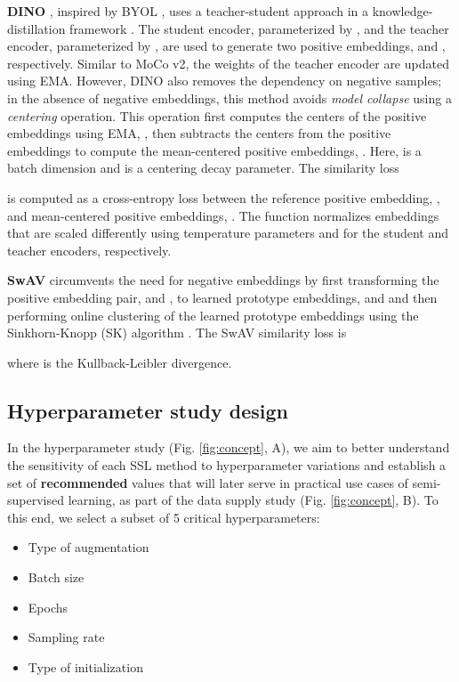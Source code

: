 \documentclass[times,twocolumn,final]{elsarticle}
\begin{document}
\noindent\textbf{DINO} \citep{caron2021emerging}, inspired by BYOL \citep{Byol2020}, uses a teacher-student approach in a knowledge-distillation framework \citep{hinton2015distilling}. The student encoder, parameterized by , and the teacher encoder, parameterized by , are used to generate two positive embeddings,  and , respectively. Similar to MoCo v2, the weights of the teacher encoder are updated using EMA. However, DINO also removes the dependency on negative samples; in the absence of negative embeddings, this method avoids \emph{model collapse} using a \emph{centering} operation. This operation first computes the centers of the positive embeddings using EMA, , then subtracts the centers  from the positive embeddings to compute the mean-centered positive embeddings, . Here,  is a batch dimension and  is a centering decay parameter. The similarity loss 

is computed as a cross-entropy loss between the reference positive embedding, , and mean-centered positive embeddings, . The  function normalizes embeddings that are scaled differently using temperature parameters  and  for the student and teacher encoders, respectively.


\noindent\textbf{SwAV} \citep{caron2020unsupervised} circumvents the need for negative embeddings by first transforming the positive embedding pair,  and , to learned prototype embeddings,  and  and then performing online clustering of the learned prototype embeddings using the Sinkhorn-Knopp (SK) algorithm \citep{Cuturi13}. The SwAV similarity loss is 

where  is the Kullback-Leibler divergence.

\subsection{Hyperparameter study design}\label{sec:hparam_study}
In the hyperparameter study (Fig. \ref{fig:concept}, A), we aim to better understand the sensitivity of each SSL method to hyperparameter variations and establish a set of \textbf{recommended} values that will later serve in practical use cases of semi-supervised learning, as part of the data supply study (Fig. \ref{fig:concept}, B). To this end, we select a subset of 5 critical hyperparameters:

\begin{itemize}
    \item Type of augmentation
    \item Batch size
    \item Epochs
    \item Sampling rate
    \item Type of initialization
\end{itemize}
\end{document}
